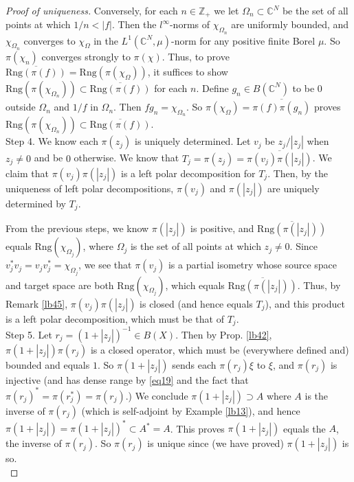 \documentclass[12pt,b5paper,notitlepage]{article}
\theoremstyle{definition}
\theoremstyle{plain}
\newcommand{\ovl}{\overline}
\newcommand{\Cbb}{\mathbb C}
\newcommand{\Zbb}{\mathbb Z}
\newcommand{\Rng}{\mathrm{Rng}}
\numberwithin{equation}{section}
\begin{document}
\begin{proof}[Proof of uniqueness]
Conversely, for each $n\in\Zbb_+$ we let $\Omega_n\subset\Cbb^N$ be the set of all points at which $1/n<|f|$. Then the $l^\infty$-norms  of $\chi_{\Omega_n}$ are uniformly bounded, and $\chi_{\Omega_n}$ converges to $\chi_\Omega$ in the $L^1(\Cbb^N,\mu)$-norm for any positive finite Borel $\mu$. So $\pi(\chi_n)$ converges strongly to $\pi(\chi)$. Thus, to prove   $\ovl{\Rng(\pi(f))}=\Rng(\pi(\chi_\Omega))$, it suffices to show $\Rng(\pi(\chi_{\Omega_n}))\subset\ovl{\Rng(\pi(f))}$ for each $n$. Define $g_n\in B(\Cbb^N)$ to be $0$ outside $\Omega_n$ and $1/f$ in $\Omega_n$. Then $fg_n=\chi_{\Omega_n}$. So $\pi(\chi_{\Omega})=\ovl{\pi(f)\pi(g_n)}$ proves $\Rng(\pi(\chi_{\Omega_n}))\subset\ovl{\Rng(\pi(f))}$.\\[-1ex]
	
Step 4. We know each $\pi(z_j)$ is uniquely determined. Let $v_j$ be $z_j/|z_j|$ when $z_j\neq 0$ and be $0$ otherwise. We know that $T_j=\pi(z_j)=\ovl{\pi(v_j)\pi(|z_j|)}$. We claim that $\pi(v_j)\pi(|z_j|)$ is a left polar decomposition for $T_j$. Then, by the uniqueness of left polar decompositions, $\pi(v_j)$ and $\pi(|z_j|)$ are uniquely determined by $T_j$. 

From the previous steps, we know $\pi(|z_j|)$ is positive, and $\ovl{\Rng(\pi(|z_j|))}$ equals $\Rng(\chi_{\Omega_j})$, where $\Omega_j$ is the set of all points at which $z_j\neq 0$. Since $v_j^*v_j=v_jv_j^*=\chi_{\Omega_j}$, we see that $\pi(v_j)$ is a partial isometry whose source space and target space are both $\Rng(\chi_{\Omega_j})$, which equals $\ovl{\Rng(\pi(|z_j|))}$. Thus, by Remark \ref{lb45}, $\pi(v_j)\pi(|z_j|)$ is closed (and hence equals $T_j$), and this product is a left polar decomposition, which must be that of $T_j$.\\[-1ex]

Step 5. Let $r_j=(1+|z_j|)^{-1}\in B(X)$. Then by Prop. \ref{lb42},  $\pi(1+|z_j|)\pi(r_j)$ is a closed operator, which must be (everywhere defined and) bounded and equals $1$. So $\pi(1+|z_j|)$ sends each $\pi(r_j)\xi$ to $\xi$, and $\pi(r_j)$ is injective (and has dense range by \eqref{eq19} and the fact that $\pi(r_j)^*=\pi(r_j^*)=\pi(r_j)$.) We conclude $\pi(1+|z_j|)\supset A$ where $A$ is the inverse of $\pi(r_j)$ (which is self-adjoint by Example \ref{lb13}), and hence $\pi(1+|z_j|)=\pi(1+|z_j|)^*\subset A^*=A$. This proves $\pi(1+|z_j|)$ equals the $A$, the inverse  of $\pi(r_j)$. So $\pi(r_j)$ is unique since (we have proved) $\pi(1+|z_j|)$ is so.\\[-1ex]




\end{proof}
\end{document}
